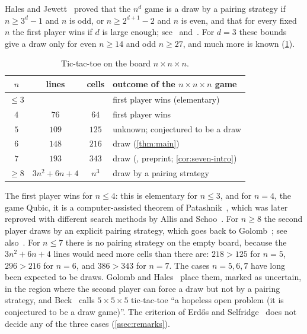 Hales and Jewett~\cite{HalesJewett1963} proved that the $n^d$ game is a draw by a pairing strategy if
$n\ge 3^d-1$ and $n$ is odd, or $n\ge 2^{d+1}-2$ and $n$ is even, and that for every fixed $n$ the first
player wins if $d$ is large enough; see~\cite[p.~300]{ErdosSelfridge1973}
and~\cite[Theorem~2.1 and Corollary~3.4]{Krivelevich2014}. For $d=3$ these bounds give a draw only for
even $n\ge 14$ and odd $n\ge 27$, and much more is known (\cref{tab:known}).

\begin{table}[ht]
\centering\small
\begin{tabular}{@{}cccl@{}}
\toprule
$n$ & lines & cells & outcome of the $n\times n\times n$ game\\
\midrule
$\le 3$ & & & first player wins (elementary)\\
$4$ & $76$ & $64$ & first player wins \cite{Patashnik1980,AllisSchoo1992,Allis1994}\\
$5$ & $109$ & $125$ & unknown; conjectured to be a draw \cite{Beck2008,GolombHales2002}\\
$6$ & $148$ & $216$ & draw (\cref{thm:main})\\
$7$ & $193$ & $343$ & draw (\cite{CainRaymondKallersjo2025}, preprint; \cref{cor:seven-intro})\\
$\ge 8$ & $3n^2+6n+4$ & $n^3$ & draw by a pairing strategy \cite{GolombHales2002}\\
\bottomrule
\end{tabular}
\caption{Tic-tac-toe on the board $n\times n\times n$.}
\label{tab:known}
\end{table}

The first player wins for $n\le 4$: this is elementary for $n\le 3$, and for $n=4$, the game Qubic, it
is a computer-assisted theorem of Patashnik~\cite{Patashnik1980}, which was later reproved with
different search methods by Allis and Schoo~\cite{AllisSchoo1992,Allis1994}. For $n\ge 8$ the second
player draws by an explicit pairing strategy, which goes back to
Golomb~\cite[p.~181]{GolombHales2002}; see also~\cite[Chapter~22]{BerlekampConwayGuy2003}. For $n\le 7$
there is no pairing strategy on the
empty board, because the $3n^2+6n+4$ lines would need more cells than there are: $218>125$ for $n=5$,
$296>216$ for $n=6$, and $386>343$ for $n=7$. The cases $n=5,6,7$ have long been expected to be draws.
Golomb and Hales~\cite[Table~1]{GolombHales2002} place them, marked as uncertain, in the region where
the second player can force a draw but not by a pairing strategy, and Beck~\cite[p.~1]{Beck2008} calls
$5\times5\times5$ tic-tac-toe ``a hopeless open problem (it is conjectured to be a draw game)''. The
criterion of Erd\H{o}s and Selfridge~\cite{ErdosSelfridge1973} does not decide any of the three cases
(\cref{ssec:remarks}).

